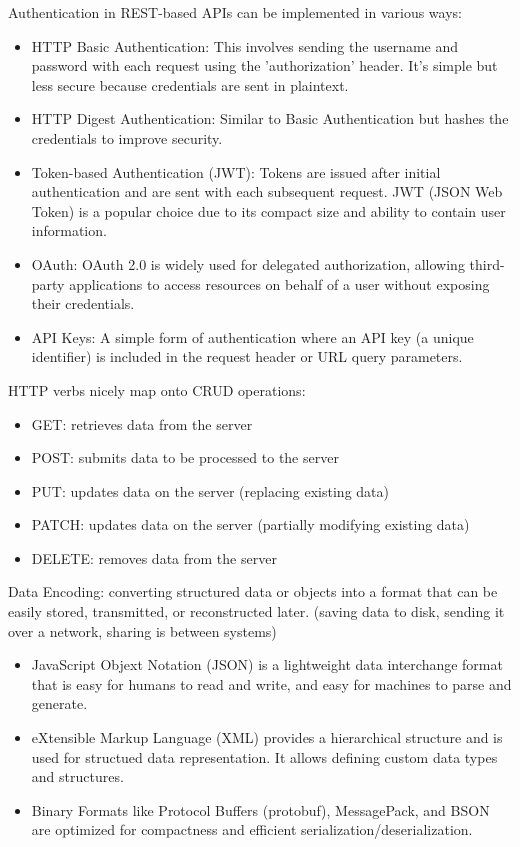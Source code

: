 \documentclass{article}
\begin{document}
Authentication in REST-based APIs can be implemented in various ways:
\begin{itemize}
\item HTTP Basic Authentication: This involves sending the username and password with each request using the 'authorization' header. It's simple but less secure because credentials are sent in plaintext.
\item HTTP Digest Authentication: Similar to Basic Authentication but hashes the credentials to improve security.
\item Token-based Authentication (JWT): Tokens are issued after initial authentication and are sent with each subsequent request. JWT (JSON Web Token) is a popular choice due to its compact size and ability to contain user information.
\item OAuth: OAuth 2.0 is widely used for delegated authorization, allowing third-party applications to access resources on behalf of a user without exposing their credentials.
\item API Keys: A simple form of authentication where an API key (a unique identifier) is included in the request header or URL query parameters.
\end{itemize}

HTTP verbs nicely map onto CRUD operations:
\begin{itemize}
\item GET: retrieves data from the server
\item POST: submits data to be processed to the server
\item PUT: updates data on the server (replacing existing data)
\item PATCH: updates data on the server (partially modifying existing data)
\item DELETE: removes data from the server
\end{itemize}

Data Encoding: converting structured data or objects into a format that can be easily stored, transmitted, or reconstructed later. (saving data to disk, sending it over a network, sharing is between systems)
\begin{itemize}
\item JavaScript Objext Notation (JSON) is a lightweight data interchange format that is easy for humans to read and write, and easy for machines to parse and generate.
\item eXtensible Markup Language (XML) provides a hierarchical structure and is used for structued data representation. It allows defining custom data types and structures.
\item Binary Formats like Protocol Buffers (protobuf), MessagePack, and BSON are optimized for compactness and efficient serialization/deserialization.
\end{itemize}
  
\end{document}
